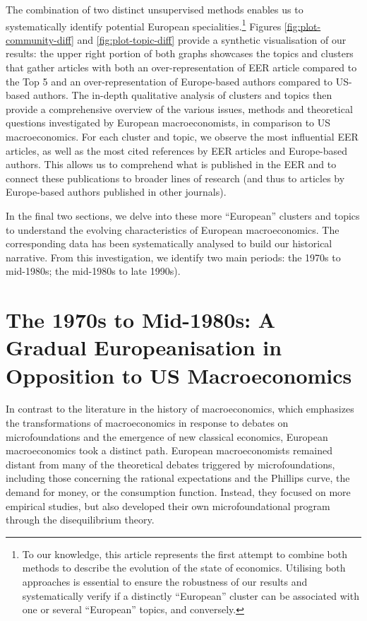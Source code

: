 \documentclass[
  12pt,
  onecolumn]{article}
\begin{document}
The combination of two distinct unsupervised methods enables us to systematically identify potential European specialities.\footnote{To our knowledge, this article represents the first attempt to combine both methods to describe the evolution of the state of economics. Utilising both approaches is essential to ensure the robustness of our results and systematically verify if a distinctly ``European'' cluster can be associated with one or several ``European'' topics, and conversely.} Figures \ref{fig:plot-community-diff} and \ref{fig:plot-topic-diff} provide a synthetic visualisation of our results: the upper right portion of both graphs showcases the topics and clusters that gather articles with both an over-representation of EER article compared to the Top 5 and an over-representation of Europe-based authors compared to US-based authors. The in-depth qualitative analysis of clusters and topics then provide a comprehensive overview of the various issues, methods and theoretical questions investigated by European macroeconomists, in comparison to US macroeconomics. For each cluster and topic, we observe the most influential EER articles, as well as the most cited references by EER articles and Europe-based authors. This allows us to comprehend what is published in the EER and to connect these publications to broader lines of research (and thus to articles by Europe-based authors published in other journals).

In the final two sections, we delve into these more ``European'' clusters and topics to understand the evolving characteristics of European macroeconomics. The corresponding data has been systematically analysed to build our historical narrative. From this investigation, we identify two main periods: the 1970s to mid-1980s; the mid-1980s to late 1990s).

\hypertarget{the-1970s-to-mid-1980s-a-gradual-europeanisation-in-opposition-to-us-macroeconomics}{%
\section{The 1970s to Mid-1980s: A Gradual Europeanisation in Opposition to US Macroeconomics}\label{the-1970s-to-mid-1980s-a-gradual-europeanisation-in-opposition-to-us-macroeconomics}}

In contrast to the literature in the history of macroeconomics, which emphasizes the transformations of macroeconomics in response to debates on microfoundations and the emergence of new classical economics, European macroeconomics took a distinct path. European macroeconomists remained distant from many of the theoretical debates triggered by microfoundations, including those concerning the rational expectations and the Phillips curve, the demand for money, or the consumption function. Instead, they focused on more empirical studies, but also developed their own microfoundational program through the disequilibrium theory.
\end{document}
